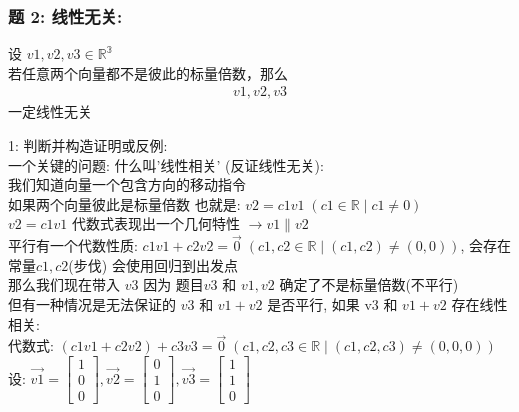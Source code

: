 \documentclass[12pt]{article}
\begin{document}
\begin{flushleft}
    \subsubsection{题 2: 线性无关:}
    设 $v1,v2,v3 \in \mathbb{R^{3}}$ \\
    若任意两个向量都不是彼此的标量倍数，那么 \\
    \begin{align}
        {v1,v2, v3}
    \end{align}
    一定线性无关

    1: 判断并构造证明或反例:\\
    一个关键的问题: 什么叫'线性相关' (反证线性无关): \\

    我们知道向量一个包含方向的移动指令 \\
    如果两个向量彼此是标量倍数 也就是: $v2 = c1v1 \; ({c1 \in \mathbb{R} \mid c1 \neq 0 })$ \\
    $v2 = c1v1$ 代数式表现出一个几何特性 $\rightarrow v1 \parallel v2 $ \\

    平行有一个代数性质: $c1v1 + c2v2 = \vec{0} \; ({c1,c2 \in \mathbb{R}  \mid  (c1,c2)\neq (0, 0) })$, 会存在常量$c1,c2$(步伐) 会使用回归到出发点 \\
    那么我们现在带入 $v3$ 因为 题目$v3$ 和 $v1,v2$ 确定了不是标量倍数(不平行) \\
    但有一种情况是无法保证的 $v3$ 和 $v1 + v2$ 是否平行, 如果 v3 和 $v1 + v2$ 存在线性相关: \\
    代数式: $(c1v1 +  c2v2) + c3v3 = \vec{0} \; ({c1,c2,c3 \in \mathbb{R}  \mid (c1, c2, c3)\neq (0, 0, 0)})$ \\

    设: $\vec{v1} =  \begin{bmatrix}
            1 \\
            0 \\
            0
        \end{bmatrix}, \vec{v2} = \begin{bmatrix}
            0 \\
            1 \\
            0
        \end{bmatrix}, \vec{v3}= \begin{bmatrix}
            1 \\
            1 \\
            0
        \end{bmatrix}$ \\


\end{flushleft}
\end{document}
